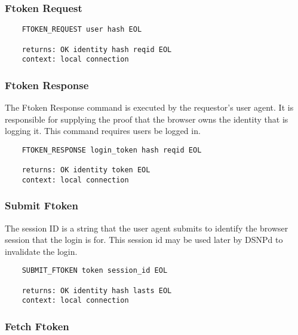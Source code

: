 \documentclass[letterpaper,11pt,oneside]{article}
\begin{document}
\subsubsection{Ftoken Request}

\vspace{10pt}
\begin{verbatim}
    FTOKEN_REQUEST user hash EOL 

    returns: OK identity hash reqid EOL
    context: local connection
\end{verbatim}
\vspace{10pt}

\subsubsection{Ftoken Response}

The Ftoken Response command is executed by the requestor's user agent. It is
responsible for supplying the proof that the browser owns the identity that is
logging it. This command requires users be logged in.

\vspace{10pt}
\begin{verbatim}
    FTOKEN_RESPONSE login_token hash reqid EOL 

    returns: OK identity token EOL
    context: local connection
\end{verbatim}
\vspace{10pt}

\subsubsection{Submit Ftoken}

The session ID is a string that the user agent submits to identify the browser
session that the login is for. This session id may be used later by DSNPd to
invalidate the login.

\vspace{10pt}
\begin{verbatim}
    SUBMIT_FTOKEN token session_id EOL 

    returns: OK identity hash lasts EOL
    context: local connection
\end{verbatim}
\vspace{10pt}

\subsubsection{Fetch Ftoken}
\end{document}
